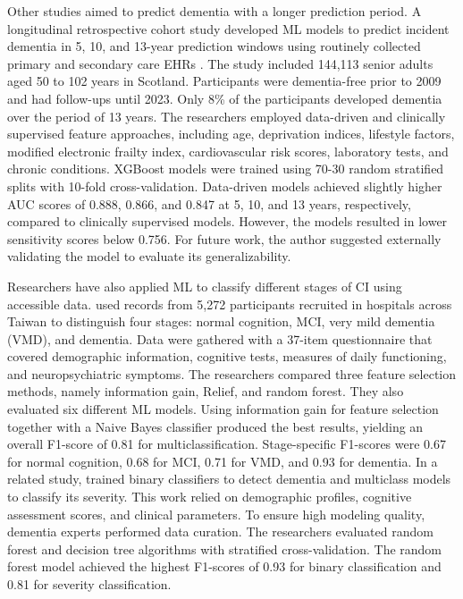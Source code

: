 Other studies aimed to predict dementia with a longer prediction period. A longitudinal retrospective cohort study developed ML models to predict incident dementia in 5, 10, and 13-year prediction windows using routinely collected primary and secondary care EHRs \cite{Georgiev2024Predicting}. The study included 144,113 senior adults aged 50 to 102 years in Scotland. Participants were dementia-free prior to 2009 and had follow-ups until 2023. Only 8\% of the participants developed dementia over the period of 13 years. The researchers employed data-driven and clinically supervised feature approaches, including age, deprivation indices, lifestyle factors, modified electronic frailty index, cardiovascular risk scores, laboratory tests, and chronic conditions. XGBoost models were trained using 70-30 random stratified splits with 10-fold cross-validation. Data-driven models achieved slightly higher AUC scores of 0.888, 0.866, and 0.847 at 5, 10, and 13 years, respectively, compared to clinically supervised models. However, the models resulted in lower sensitivity scores below 0.756. For future work, the author suggested externally validating the model to evaluate its generalizability.

Researchers have also applied ML to classify different stages of CI using accessible data.  used records from 5,272 participants recruited in hospitals across Taiwan to distinguish four stages: normal cognition, MCI, very mild dementia (\acrshort{VMD}), and dementia. Data were gathered with a 37-item questionnaire that covered demographic information, cognitive tests, measures of daily functioning, and neuropsychiatric symptoms. The researchers compared three feature selection methods, namely information gain, Relief, and random forest. They also evaluated six different ML models. Using information gain for feature selection together with a Naive Bayes classifier produced the best results, yielding an overall F1-score of 0.81 for multiclassification. Stage-specific F1-scores were 0.67 for normal cognition, 0.68 for MCI, 0.71 for VMD, and 0.93 for dementia. In a related study,  trained binary classifiers to detect dementia and multiclass models to classify its severity. This work relied on demographic profiles, cognitive assessment scores, and clinical parameters. To ensure high modeling quality, dementia experts performed data curation. The researchers evaluated random forest and decision tree algorithms with stratified cross-validation. The random forest model achieved the highest F1-scores of 0.93 for binary classification and 0.81 for severity classification.

